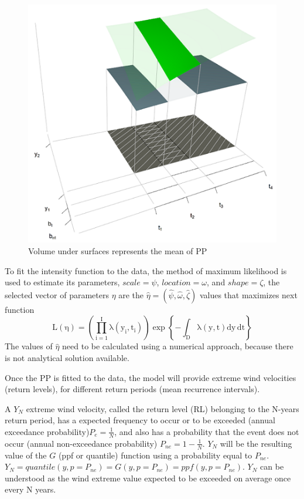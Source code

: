 \documentclass[12pt,oneside]{reedthesis}
\begin{document}
\footnotesize
\begin{figure}
\includegraphics[width=6.35in]{figure/domain3d} \caption{Volume under surfaces represents the mean of PP}\label{fig:plotdomain3dpp}
\end{figure}
\normalsize

To fit the intensity function to the data, the method of maximum likelihood is used to estimate its parameters, \(scale = \psi\), \(location = \omega\), and \(shape = \zeta\), the selected vector of parameters \(\eta\) are the \(\hat\eta = (\hat\psi, \hat\omega, \hat\zeta)\) values that maximizes next function
\begin{equation}
  \mathrm{
          L(\eta)=\left( 
                        \prod_{i=1}^I\lambda\left(y_i,t_i\right)  
                  \right)
                  \exp\left\{
                            -\int_{{D}}\lambda\left(y,t\right)dy\,dt
                     \right\}
         }
  \label{eq:pplikelihood}
\end{equation}
The values of \(\hat\eta\) need to be calculated using a numerical approach, because there is not analytical solution available.

Once the PP is fitted to the data, the model will provide extreme wind velocities (return levels), for different return periods (mean recurrence intervals).

A \(Y_N\) extreme wind velocity, called the return level (RL) belonging to the N-years return period, has a expected frequency to occur or to be exceeded (annual exceedance probability)\(P_e = \frac{1}{N}\), and also has a probability that the event does not occur (annual non-exceedance probability) \(P_{ne}=1-\frac{1}{N}\). \(Y_N\) will be the resulting value of the \(G\) (ppf or quantile) function using a probability equal to \(P_{ne}\). \(Y_N=quantile(y, p=P_{ne})=G(y,p=P_{ne})=ppf(y,p=P_{ne})\). \(Y_N\) can be understood as the wind extreme value expected to be exceeded on average once every N years.
\end{document}
